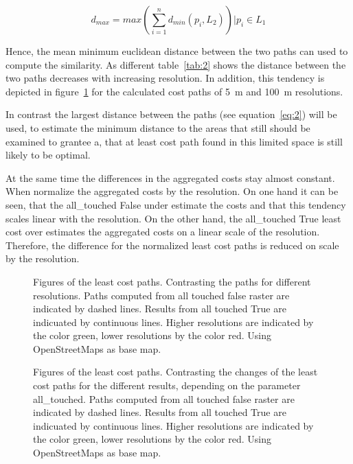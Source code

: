 \begin{equation}
\label{eq:2}
d_{max} = max(\sum_{i=1}^{n} d_{min}(p_i, L_2)) \bigg\vert p_i \in L_1
\end{equation}

Hence, the mean minimum euclidean distance between the two paths can used to compute
the similarity.
As different table~\ref{tab:2} shows the distance between the two paths decreases
with increasing resolution.
In addition, this tendency is depicted in figure~\ref{fig:paths_resolution} for the calculated cost paths of 5~m and 100~m resolutions.

In contrast the largest distance between the paths (see equation~\ref{eq:2}) will be used, to estimate the minimum distance to the areas that still should be examined to grantee a, that at least cost path found in this limited space is still likely to be optimal.


At the same time the differences in the aggregated costs stay almost constant.
When normalize the aggregated costs by the resolution.
On one hand it can be seen, that the all\_touched False under estimate the costs and that this tendency scales
linear with the resolution.
On the other hand, the all\_touched True least cost over estimates the aggregated costs on a linear scale of
the resolution.
Therefore, the difference for the normalized least cost paths is reduced on scale by the resolution.

\begin{figure}
	\centering

	\qquad
	\caption{Figures of the least cost paths. Contrasting the paths for different resolutions. Paths computed from all touched false raster are indicated by dashed lines. Results from all touched True are indicuated by continuous lines. Higher resolutions are indicated by the color green, lower resolutions by the color red. Using OpenStreetMaps as base map.}
	\label{fig:paths_resolution}
\end{figure}

\begin{figure}
	\centering

	\qquad

	\caption{Figures of the least cost paths. Contrasting the changes of the least cost paths for the different results, depending on the parameter all\_touched. Paths computed from all touched false raster are indicated by dashed lines. Results from all touched True are indicuated by continuous lines. Higher resolutions are indicated by the color green, lower resolutions by the color red. Using OpenStreetMaps as base map.}
	\label{fig:paths_alltouched}
\end{figure}

